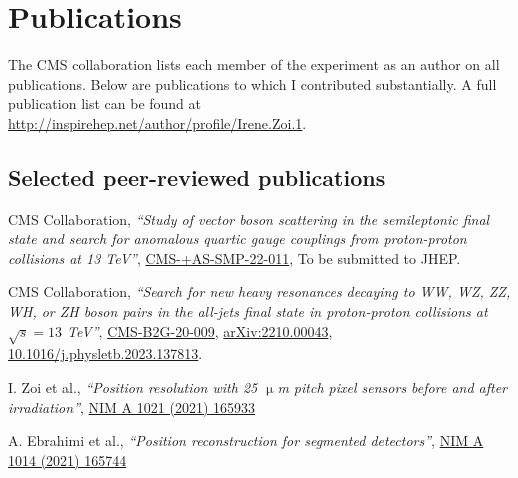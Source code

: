 \ifacademic
  \section{Publications}
The CMS collaboration lists each member of the experiment as an author on all publications. Below are publications to which I contributed substantially. A full publication list can be found at \\ \href{http://inspirehep.net/author/profile/Irene.Zoi.1}{http://inspirehep.net/author/profile/Irene.Zoi.1}.  

\subsection{Selected peer-reviewed publications}
    \begin{refsection}
      \vspace{2mm}
      \onehalfspacing
CMS Collaboration, {\sl ``Study of vector boson scattering in the semileptonic final state and search for anomalous quartic gauge couplings from proton-proton collisions at 13 TeV''},
\href{https://cds.cern.ch/record/2926224/files/SMP-22-011-pas.pdf}{CMS-+AS-SMP-22-011},
To be submitted to JHEP.
    \end{refsection}
  


    \begin{refsection}
      \vspace{2mm}
      \onehalfspacing
CMS Collaboration, {\sl ``Search for new heavy resonances decaying to WW, WZ, ZZ, WH, or ZH boson pairs in the all-jets final state in proton-proton collisions at $\sqrt{s}=13$ TeV''},
\href{https://cds.cern.ch/record/2835154?ln=en}{CMS-B2G-20-009},
\href{https://arxiv.org/abs/2210.00043}{arXiv:2210.00043},
\href{http://dx.doi.org/10.1016/j.physletb.2023.137813}{10.1016/j.physletb.2023.137813}.
    \end{refsection}
    
    
     \begin{refsection}
      \vspace{2mm}
      \onehalfspacing
I. Zoi et al., {\sl ``Position resolution with 25 $\upmu$m pitch pixel sensors before and after irradiation''},  \href{https://www.sciencedirect.com/science/article/pii/S0168900221008962}{NIM A 1021 (2021) 165933}

    \end{refsection}

    \begin{refsection}
      \vspace{2mm}
      \onehalfspacing
A. Ebrahimi et al., {\sl ``Position reconstruction for segmented detectors''},  \href{https://www.sciencedirect.com/science/article/pii/S0168900221007294?via\%3Dihub}{NIM A 1014 (2021) 165744}

    \end{refsection}
    
